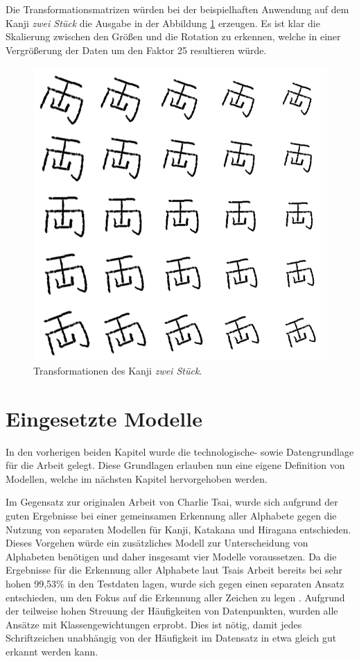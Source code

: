 \documentclass[twoside,a4paper]{IEEEtran}
\begin{document}
Die Transformationsmatrizen würden bei der beispielhaften Anwendung auf dem Kanji \textit{zwei Stück} die Ausgabe in der Abbildung \ref{rot} erzeugen. Es ist klar die Skalierung zwischen den Größen und die Rotation zu erkennen, welche in einer Vergrößerung der Daten um den Faktor 25 resultieren würde.
\begin{figure}[!htb]
	\includegraphics[width=\columnwidth]{rot_scale}
	\caption{Transformationen des Kanji \textit{zwei Stück}.}
	\label{rot}
\end{figure}
\section{Eingesetzte Modelle}
In den vorherigen beiden Kapitel wurde die technologische- sowie Datengrundlage für die Arbeit gelegt. Diese Grundlagen erlauben nun eine eigene Definition von Modellen, welche im nächsten Kapitel hervorgehoben werden. 

Im Gegensatz zur originalen Arbeit von Charlie Tsai, wurde sich aufgrund der guten Ergebnisse bei einer gemeinsamen Erkennung aller Alphabete gegen die Nutzung von separaten Modellen für Kanji, Katakana und Hiragana entschieden. Dieses Vorgehen würde ein zusätzliches Modell zur Unterscheidung von Alphabeten benötigen und daher insgesamt vier Modelle voraussetzen. Da die Ergebnisse für die Erkennung aller Alphabete laut Tsais Arbeit bereits bei sehr hohen 99,53\% in den Testdaten lagen, wurde sich gegen einen separaten Ansatz entschieden, um den Fokus auf die Erkennung aller Zeichen zu legen \cite[S.4-6]{RHC}. Aufgrund der teilweise hohen Streuung der Häufigkeiten von Datenpunkten, wurden alle Ansätze mit Klassengewichtungen erprobt. Dies ist nötig, damit jedes Schriftzeichen unabhängig von der Häufigkeit im Datensatz in etwa gleich gut erkannt werden kann.
\end{document}
